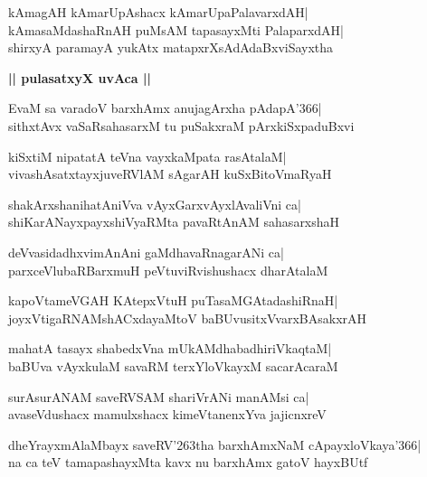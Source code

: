 \documentclass[twoside,12pt,openright]{book}
\def\S{\char'263}
\newcounter{shloka}[chapter]
\def\uvaca#1{\centerline{{\large\textbf{#1}}}}
\begin{document}
\begin{shloka}%
kAmagAH kAmarUpAshacx kAmarUpaPalavarxdAH|\\
kAmasaMdashaRnAH puMsAM tapasayxMti PalaparxdAH|\\
shirxyA paramayA yukAtx matapxrXsAdAdaBxviSayxtha
\end{shloka}

\uvaca{|| pulasatxyX uvAca ||}
\begin{shloka}%
EvaM sa varadoV barxhAmx anujagArxha pAdapA\char'366|\\
sithxtAvx vaSaRsahasarxM tu puSakxraM pArxkiSxpaduBxvi
\end{shloka}

\begin{shloka}%
kiSxtiM nipatatA teVna vayxkaMpata rasAtalaM|\\
vivashAsatxtayxjuveRVlAM sAgarAH kuSxBitoVmaRyaH
\end{shloka}

\begin{shloka}%
shakArxshanihatAniVva vAyxGarxvAyxlAvaliVni ca|\\
shiKarANayxpayxshiVyaRMta pavaRtAnAM sahasarxshaH
\end{shloka}

\begin{shloka}%
deVvasidadhxvimAnAni gaMdhavaRnagarANi ca|\\
parxceVlubaRBarxmuH peVtuviRvishushacx dharAtalaM
\end{shloka}

\begin{shloka}%
kapoVtameVGAH KAtepxVtuH puTasaMGAtadashiRnaH|\\
joyxVtigaRNAMshACxdayaMtoV baBUvusitxVvarxBAsakxrAH
\end{shloka}

\begin{shloka}%
mahatA tasayx shabedxVna mUkAMdhabadhiriVkaqtaM|\\
baBUva vAyxkulaM savaRM terxYloVkayxM sacarAcaraM
\end{shloka}

\begin{shloka}%
surAsurANAM saveRVSAM shariVrANi manAMsi ca|\\
avaseVdushacx mamulxshacx kimeVtanenxYva jajicnxreV
\end{shloka}

\begin{shloka}%
dheYrayxmAlaMbayx saveRV\S tha barxhAmxNaM cApayxloVkaya\char'366|\\
na ca teV tamapashayxMta kavx nu barxhAmx gatoV hayxBUtf
\end{shloka}
\end{document}
